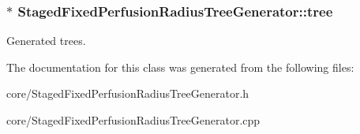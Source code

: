 \subsubsection[{\texorpdfstring{tree}{tree}}]{$\ast$ Staged\+Fixed\+Perfusion\+Radius\+Tree\+Generator\+::tree\hspace{0.3cm}{\ttfamily [private]}}\hypertarget{class_staged_fixed_perfusion_radius_tree_generator_ae07119a1095859cc74c7144ea0b87040}{}\label{class_staged_fixed_perfusion_radius_tree_generator_ae07119a1095859cc74c7144ea0b87040}
Generated trees. 

The documentation for this class was generated from the following files\+:\begin{DoxyCompactItemize}
\item 
core/Staged\+Fixed\+Perfusion\+Radius\+Tree\+Generator.\+h\item 
core/Staged\+Fixed\+Perfusion\+Radius\+Tree\+Generator.\+cpp\end{DoxyCompactItemize}
